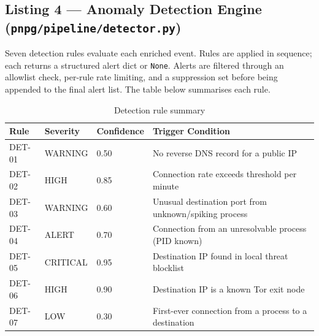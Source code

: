 \documentclass[12pt]{article}
\begin{document}
\subsection*{Listing 4 --- Anomaly Detection Engine (\texttt{pnpg/pipeline/detector.py})}

Seven detection rules evaluate each enriched event. Rules are applied in
sequence; each returns a structured alert dict or \texttt{None}. Alerts are
filtered through an allowlist check, per-rule rate limiting, and a
suppression set before being appended to the final alert list. The table below
summarises each rule.

\begin{table}[H]
\centering
\small
\begin{tabular}{lllp{5cm}}
\toprule
\textbf{Rule} & \textbf{Severity} & \textbf{Confidence} & \textbf{Trigger Condition} \\
\midrule
DET-01 & WARNING  & 0.50 & No reverse DNS record for a public IP \\
DET-02 & HIGH     & 0.85 & Connection rate exceeds threshold per minute \\
DET-03 & WARNING  & 0.60 & Unusual destination port from unknown/spiking process \\
DET-04 & ALERT    & 0.70 & Connection from an unresolvable process (PID known) \\
DET-05 & CRITICAL & 0.95 & Destination IP found in local threat blocklist \\
DET-06 & HIGH     & 0.90 & Destination IP is a known Tor exit node \\
DET-07 & LOW      & 0.30 & First-ever connection from a process to a destination \\
\bottomrule
\end{tabular}
\caption{Detection rule summary}
\end{table}
\end{document}
